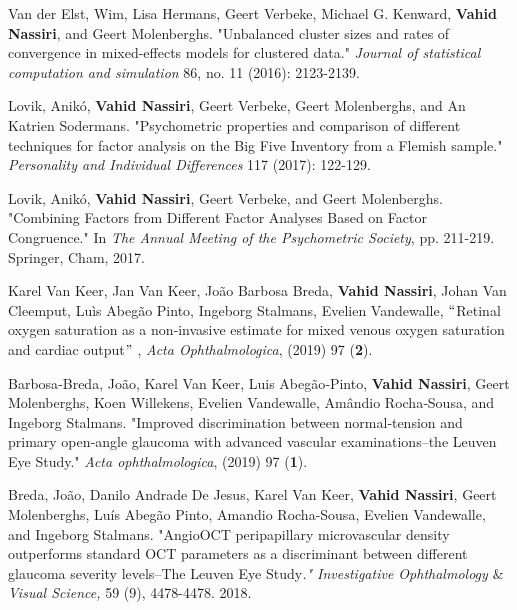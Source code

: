 \documentclass[11pt,a5paper,twoside]{book}
\begin{document}
\begin{enumerate}

	\item {Van der Elst, Wim, Lisa Hermans, Geert Verbeke, Michael G. Kenward, \textbf{Vahid Nassiri}, and Geert Molenberghs. "Unbalanced cluster sizes and rates of convergence in mixed-effects models for clustered data." \textit{Journal of statistical computation and simulation} 86, no. 11 (2016): 2123-2139.}
	
	\item \textcolor[HTML]{222222}{Lovik, Anikó, \textbf{Vahid Nassiri}, Geert Verbeke, Geert Molenberghs, and An Katrien Sodermans. "Psychometric properties and comparison of different techniques for factor analysis on the Big Five Inventory from a Flemish sample." \textit{Personality and Individual Differences} 117 (2017): 122-129.}

	\item \textcolor[HTML]{222222}{Lovik, Anikó, \textbf{Vahid Nassiri}, Geert Verbeke, and Geert Molenberghs. "Combining Factors from Different Factor Analyses Based on Factor Congruence." In \textit{The Annual Meeting of the Psychometric Society}, pp. 211-219. Springer, Cham, 2017.}

	
\item Karel Van Keer, Jan Van Keer, João Barbosa Breda, \textbf{Vahid Nassiri}, Johan Van Cleemput, Luìs Abegão Pinto, Ingeborg Stalmans, Evelien Vandewalle, $``$Retinal oxygen saturation as a non‐invasive estimate for mixed venous oxygen saturation and cardiac output$"$ , \textit{Acta Ophthalmologica},  (2019) 97 (\textbf{2}).

	\item {Barbosa‐Breda, João, Karel Van Keer, Luis Abegão‐Pinto, \textbf{Vahid Nassiri}, Geert Molenberghs, Koen Willekens, Evelien Vandewalle, Amândio Rocha‐Sousa, and Ingeborg Stalmans. "Improved discrimination between normal‐tension and primary open‐angle glaucoma with advanced vascular examinations–the Leuven Eye Study." \textit{Acta ophthalmologica}, (2019) 97 (\textbf{1}).

	\item {Breda, João, Danilo Andrade De Jesus, Karel Van Keer, \textbf{Vahid Nassiri}, Geert Molenberghs, Luís Abegão Pinto, Amandio Rocha-Sousa, Evelien Vandewalle, and Ingeborg Stalmans. "AngioOCT peripapillary microvascular density outperforms standard OCT parameters as a discriminant between different glaucoma severity levels–The Leuven Eye Study\textit{." Investigative Ophthalmology $\&$  Visual Science, }59 (9), 4478-4478. 2018.}

}
\end{enumerate}
\end{document}
